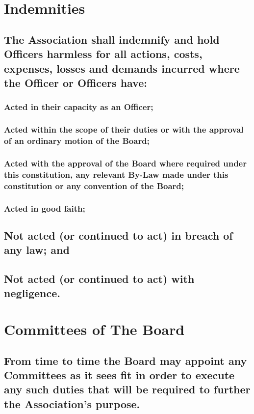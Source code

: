 \documentclass{article}
\newenvironment{subs}
  {\adjustwidth{2em}{0pt}}
  {\endadjustwidth}
\begin{document}
\begin{subs}
\begin{subs}
\section{Indemnities}
\begin{subs}
\subsection{The Association shall indemnify and hold Officers harmless for all actions, costs, expenses, losses and demands incurred where the Officer or Officers have:}
\begin{subs}
\subsubsection{Acted in their capacity as an Officer;}
\subsubsection{Acted within the scope of their duties or with the approval of an ordinary motion of the Board;}
\subsubsection{Acted with the approval of the Board where required under this constitution, any relevant By-Law made under this constitution or any convention of the Board;}
\subsubsection{Acted in good faith;}
\subsection{Not acted (or continued to act) in breach of any law; and}
\subsection{Not acted (or continued to act) with negligence.}
\end{subs}
\end{subs}

\section{Committees of The Board}
\begin{subs}
\subsection{From time to time the Board may appoint any Committees as it sees fit in order to execute any such duties that will be required to further the Association's purpose.}

\end{subs}
\end{subs}
\end{subs}
\end{document}
